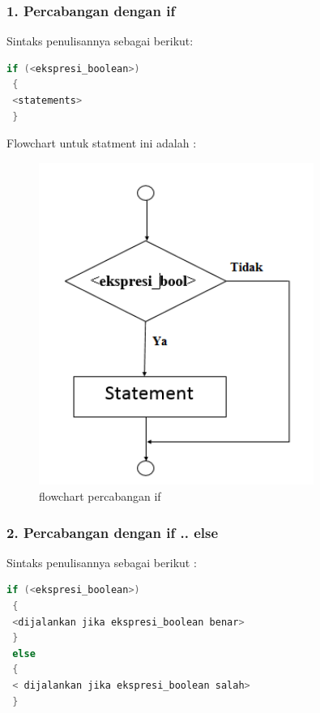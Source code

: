 \subsubsection{1. Percabangan dengan if}\label{percabangan-dengan-if}

Sintaks penulisannya sebagai berikut:

\begin{lstlisting}[language=c++, numbers=none]
 if (<ekspresi_boolean>)
 {
 <statements>
 }
\end{lstlisting}

Flowchart untuk statment ini adalah :

\begin{figure}[htbp]
\centering
\includegraphics[width=0.8\textwidth]{images/capture2-4.png}
\caption{flowchart percabangan if}
\end{figure}

\subsubsection{2. Percabangan dengan if ..
else}\label{percabangan-dengan-if-..-else}

Sintaks penulisannya sebagai berikut :

\begin{lstlisting}[language=c++]
 if (<ekspresi_boolean>)
 {
 <dijalankan jika ekspresi_boolean benar>
 }
 else
 {
 < dijalankan jika ekspresi_boolean salah>
 }
\end{lstlisting}

